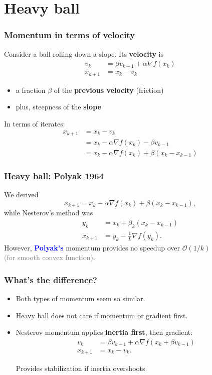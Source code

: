 \documentclass[aspectratio=149]{beamer}
\begin{document}
\section{Heavy ball}%
\label{sec:}

\begin{frame}
  \frametitle{Momentum in terms of velocity}
  Consider a ball rolling down a slope. Its \textbf{velocity} is
  \begin{align}
    v_k &= \beta v_{k-1} + \alpha \nabla f(x_k) \\
    x_{k+1} &= x_k - v_k
  \end{align}
  \begin{itemize}
    \item a fraction $\beta$ of the \textbf{previous velocity} (friction)
    \item plus, steepness of the \textbf{slope}
  \end{itemize}
  In terms of iterates:
  \begin{align}
    x_{k+1} &= x_k - v_k \\
            &= x_k - \alpha \nabla f(x_k) - \beta v_{k-1} \\
            &= x_k - \alpha \nabla f(x_k) + \beta (x_k - x_{k-1})
  \end{align}
\end{frame}

\begin{frame}
  \frametitle{Heavy ball:  Polyak 1964}
  We derived
  \begin{equation}
    x_{k+1} = x_k - \alpha \nabla f(x_k) + \beta (x_k - x_{k-1}),
  \end{equation}
  while Nesterov's method was
  \begin{align}
    y_{k} &= x_k + \beta_k (x_k - x_{k-1}) \\
    x_{k+1} &= y_k - \frac{1}{L} \nabla f(y_k).
  \end{align}
  However, \textcolor{blue}{\textbf{Polyak's}} momentum provides no speedup over $\mathcal{O}(1/k)$ \\
  \textcolor{gray}{(for smooth convex function)}.
\end{frame}


\begin{frame}
  \frametitle{What's the difference?}
  \begin{itemize}
    \item Both types of momentum seem so similar.
    \item Heavy ball does not care if momentum or gradient first.
    \item Nesterov momentum applies \textbf{inertia first}, then gradient:
          \begin{align}
            v_k &= \beta v_{k-1} + \alpha \nabla f(x_k + \beta v_{k-1}) \\
            x_{k+1} &= x_k - v_k.
          \end{align}
          \begin{block}{}
            \center
            Provides stabilization if inertia overshoots.
          \end{block}
  \end{itemize}
\end{frame}
\end{document}
